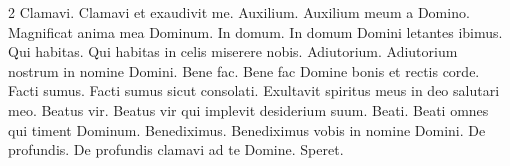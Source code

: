 \begin{multicols*}{2}
 Clamavi.
 Clamavi et exaudivit me.
 Auxilium.
 Auxilium meum a Domino.
 Magnificat anima mea Dominum.
 In domum.
 In domum Domini letantes ibimus.
 Qui habitas.
 Qui habitas in celis miserere nobis.
 Adiutorium.
 Adiutorium nostrum in nomine Domini.
 Bene fac.
 Bene fac Domine bonis et rectis corde.
 Facti sumus.
 Facti sumus sicut consolati.
 Exultavit spiritus meus in deo salutari meo.
 Beatus vir.
 Beatus vir qui implevit desiderium suum.
 Beati.
 Beati omnes qui timent Dominum.
 Benediximus.
 Benediximus vobis in nomine Domini.
 De profundis.
 De profundis clamavi ad te Domine.
 Speret.

\end{multicols*}
